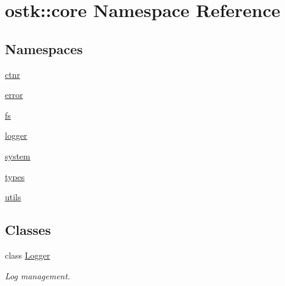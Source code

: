 \hypertarget{namespaceostk_1_1core}{}\section{ostk\+:\+:core Namespace Reference}
\label{namespaceostk_1_1core}
\subsection*{Namespaces}
\begin{DoxyCompactItemize}
\item 
 \hyperlink{namespaceostk_1_1core_1_1ctnr}{ctnr}
\item 
 \hyperlink{namespaceostk_1_1core_1_1error}{error}
\item 
 \hyperlink{namespaceostk_1_1core_1_1fs}{fs}
\item 
 \hyperlink{namespaceostk_1_1core_1_1logger}{logger}
\item 
 \hyperlink{namespaceostk_1_1core_1_1system}{system}
\item 
 \hyperlink{namespaceostk_1_1core_1_1types}{types}
\item 
 \hyperlink{namespaceostk_1_1core_1_1utils}{utils}
\end{DoxyCompactItemize}
\subsection*{Classes}
\begin{DoxyCompactItemize}
\item 
class \hyperlink{classostk_1_1core_1_1_logger}{Logger}
\begin{DoxyCompactList}\small\item\em Log management. \end{DoxyCompactList}\end{DoxyCompactItemize}

